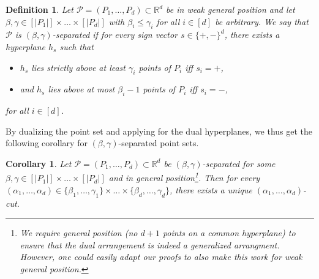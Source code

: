 \documentclass[11pt]{article}
\newtheorem{corollary}[theorem]{Corollary}
\newtheorem{definition}[theorem]{Definition}
\newcommand{\R}{\mathbb{R}}
\begin{document}
%
\begin{definition}
    Let $\mathcal{P} = (P_1, \dots, P_d ) \subset \R^d$ be in weak general position and let $\beta, \gamma \in [|P_1|] \times \dots \times [|P_d|]$ with $\beta_i \leq \gamma_i$ for all $i \in [d]$ be arbitrary. We say that $\mathcal{P}$ is $(\beta, \gamma)$-separated if for every sign vector $s \in \{+, -\}^d$, there exists a hyperplane $h_s$ such that 
    \begin{itemize}
        \item $h_s$ lies strictly above at least $\gamma_i$ points of $P_i$ iff $s_i = +$, 
        \item and $h_s$ lies above at most $\beta_i - 1$ points of $P_i$ iff $s_i = -$, 
    \end{itemize}
    for all $i \in [d]$.
\end{definition}
%
By dualizing the point set and applying  for the dual hyperplanes, we thus get the following corollary for $(\beta, \gamma)$-separated point sets.
%
\begin{corollary}
    Let $\mathcal{P} = (P_1, \dots, P_d ) \subset \R^d$ be $(\beta, \gamma)$-separated for some $\beta, \gamma \in [|P_1|] \times \dots \times [|P_d|]$ and in general position\footnote{We require general position (no $d + 1$ points on a common hyperplane) to ensure that the dual arrangement is indeed a generalized arrangment. However, one could easily adapt our proofs to also make this work for weak general position.}. Then for every $(\alpha_1, \dots, \alpha_d) \in \{\beta_1,\ldots,\gamma_1\} \times \dots \times \{\beta_d,\ldots,\gamma_d\}$, there exists a unique $(\alpha_1, \dots, \alpha_d)$-cut.
\end{corollary}
%
\end{document}
